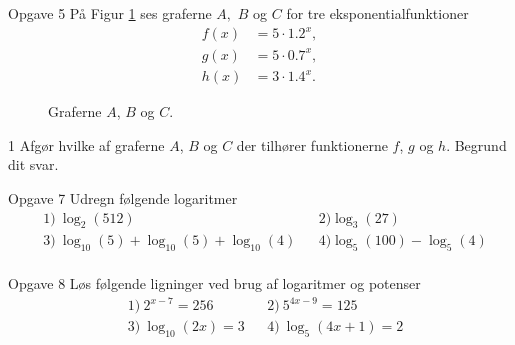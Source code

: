 \begin{opgavetekst}{Opgave 5}
	På Figur \ref{fig:grafer} ses graferne $A,$ $B$ og $C$ for tre eksponentialfunktioner
	\begin{align*}
		f(x) &= 5\cdot 1.2^x,\\
		g(x) &= 5 \cdot 0.7^x,  \\
		h(x) &= 3 \cdot 1.4^x.
	\end{align*}
	\begin{figure}[H]
		\centering
		\caption{Graferne $A$, $B$ og $C$.}
		\label{fig:grafer}
	\end{figure}
	\phantom{h}
\end{opgavetekst}
\begin{delopgave}{1}
	Afgør hvilke af graferne $A$, $B$ og $C$ der tilhører funktionerne $f$, $g$ og $h$. Begrund dit svar.
\end{delopgave}

\begin{opgavetekst}{Opgave 7}
	Udregn følgende logaritmer
	\begin{align*}
		&1) \  \log_2(512)  &   &2) \log_3(27) \\
		&3) \  \log_{10}(5) + \log_{10}(5) + \log_{10}(4)  &   &4) \log_5(100) - \log_5(4) \\
	\end{align*}
\end{opgavetekst}

\begin{opgavetekst}{Opgave 8}
	Løs følgende ligninger ved brug af logaritmer og potenser
	\begin{align*}
		&1) \ 2^{x-7} = 256 &   &2) \ 5^{4x-9} = 125\\
		&3) \ \log_{10}(2x) = 3 &   &4) \ \log_{5}(4x+1) = 2\\
	\end{align*}
\end{opgavetekst}

